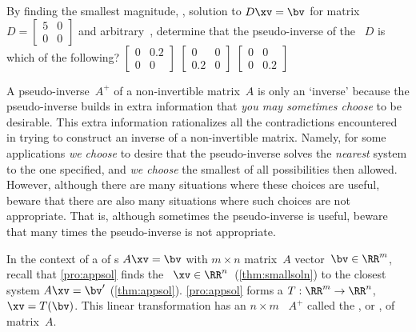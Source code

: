 \begin{activity}
By finding the smallest magnitude, , solution to \(D\xv=\bv\) for matrix \(D=\begin{bmatrix} 5&0\\0&0 \end{bmatrix}\) and arbitrary~\bv, determine that the pseudo-inverse of the ~\(D\) is which of the following?
{\(\begin{bmatrix} 0&0.2\\0&0 \end{bmatrix}\)}
{\(\begin{bmatrix} 0&0\\0.2&0 \end{bmatrix}\)}
{\(\begin{bmatrix} 0&0\\0&0.2 \end{bmatrix}\)}
\end{activity}




A pseudo-inverse~\(A^+\) of a non-invertible matrix~\(A\) is only an `inverse' because the pseudo-inverse builds in extra information that  \emph{you may sometimes choose} to be desirable.
This extra information rationalizes all the contradictions encountered in trying to construct an inverse of a non-invertible matrix.  
Namely, for some applications \emph{we choose} to desire that the pseudo-inverse solves the \emph{nearest}  system to the one specified, and \emph{we choose} the smallest of all possibilities then allowed.
However, although there are many situations where these choices are useful, beware that there are also many situations where such choices are not appropriate.
That is, although sometimes the pseudo-inverse is useful, beware that  many times the pseudo-inverse is not appropriate.


\begin{theorem} \label{thm:lsqlt}
In the context of a  of s \(A\xv=\bv\) with \(m\times n\) matrix~\(A\) vector~\(\bv\in\RR^m\), recall that \cref{pro:appsol} finds the ~\(\xv\in\RR^n\)\ (\cref{thm:smallsoln}) to the closest  system \(A\xv=\bv'\) (\cref{thm:appsol}).
\cref{pro:appsol} forms a  \(T:\RR^m\to\RR^n\), \(\xv=T(\bv)\).
This linear transformation has an \(n\times m\) ~\(A^+\) called the , or , of matrix~\(A\).
\end{theorem}

